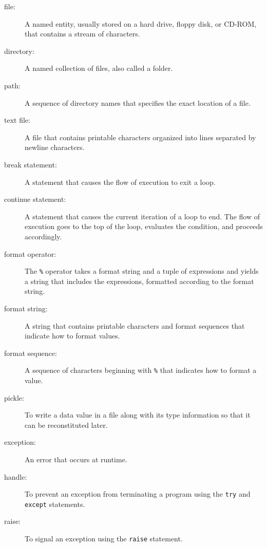 \begin{description}

\item[file:] A named entity, usually stored on a hard drive, floppy disk,
or CD-ROM, that contains a stream of characters.

\item[directory:] A named collection of files, also called a folder.

\item[path:] A sequence of directory names that specifies the
exact location of a file.

\item[text file:] A file that contains printable characters organized
into lines separated by newline characters.

\item[break statement:] A statement that causes the flow of execution
to exit a loop.

\item[continue statement:] A statement that causes the current iteration
of a loop to end.  The flow of execution goes to the top of the loop,
evaluates the condition, and proceeds accordingly.

\item[format operator:] The {\tt \%} operator takes a format
string and a tuple of expressions and yields a string that includes
the expressions, formatted according to the format string.

\item[format string:] A string that contains printable characters
and format sequences that indicate how to format values.

\item[format sequence:] A sequence of characters beginning with
{\tt \%} that indicates how to format a value.

\item[pickle:] To write a data value in a file along with its
type information so that it can be reconstituted later.

\item[exception:] An error that occurs at runtime.

\item[handle:] To prevent an exception from terminating
a program using the {\tt try}
and {\tt except} statements.

\item[raise:] To signal an exception using the {\tt raise}
statement.


\end{description}

